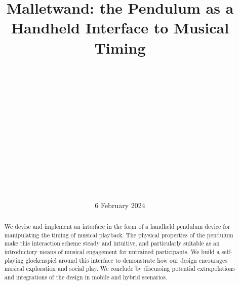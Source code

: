 \documentclass{nime-alternate} %
\begin{document}

\title{Malletwand: the Pendulum as a Handheld Interface to Musical Timing}

\label{key}
\author{
\alignauthor
{} \\
  \\
  \\
\alignauthor
{} \\
  \\
  \\
\and
\alignauthor
{} \\
  \\
  \\
\alignauthor
{}\\
  \\
  \\
}
\date{6 February 2024}

\maketitle


\begin{abstract}
We devise and implement an interface in the form of a handheld pendulum device for manipulating the timing of musical playback. The physical properties of the pendulum make this interaction scheme steady and intuitive, and particularly suitable as an introductory means of musical engagement for untrained participants. We build a self-playing glockenspiel around this interface to demonstrate how our design encourages musical exploration and social play. We conclude by discussing potential extrapolations and integrations of the design in mobile and hybrid scenarios.
\end{abstract}
\end{document}
